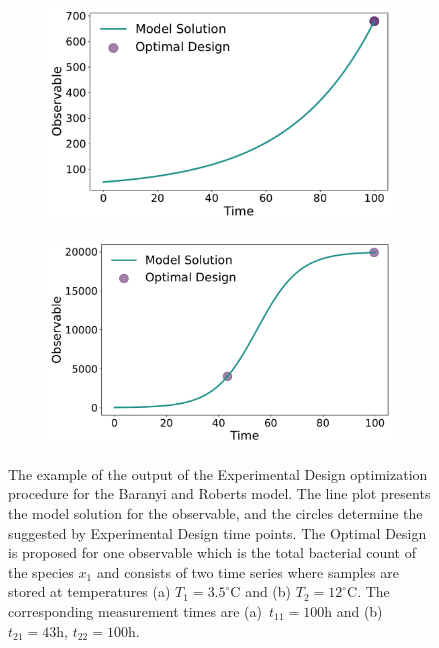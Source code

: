 \documentclass[10pt,A4paper]{article}
\begin{document}
\begin{figure}[H]
    \begin{subfigure}{.5\textwidth}
        \centering
        \includegraphics[scale=0.255]{Figures/Observable_Results_baranyi_roberts_ode_fisher_determinant_rel_sensit_cont_2times_2temps_000_x_00.pdf}
    \end{subfigure}  
    \begin{subfigure}{.5\textwidth}
        \centering
        \includegraphics[scale=0.255]{Figures/Observable_Results_baranyi_roberts_ode_fisher_determinant_rel_sensit_cont_2times_2temps_001_x_00.pdf}
    \end{subfigure}
    \caption{{\footnotesize The example of the output of the Experimental Design optimization procedure for the Baranyi and Roberts model.
    The line plot presents the model solution for the observable, and the circles determine the suggested by Experimental Design time points.
    The Optimal Design is proposed for one observable which is the total bacterial count of the species $x_1$ and consists of two time series where samples are stored at temperatures (a) $T_1 = 3.5^\circ$C and (b) $T_2 = 12^\circ$C.
    The corresponding measurement times are (a)~$t_{11}=100$h and (b)~$t_{21}=43$h, $t_{22}=100$h.}}
    \label{fig:baranyi_roberts_observable}
\end{figure}
\end{document}
